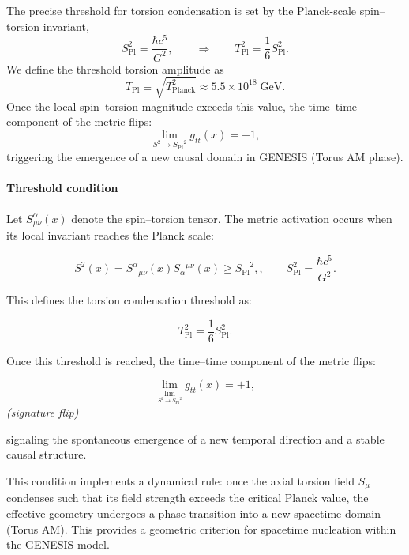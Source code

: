 \documentclass{article}
\newcommand{\Splanck}{\ensuremath{S_{\mathrm{Pl}}}}
\begin{document}
The precise threshold for torsion condensation is set by the Planck-scale spin–torsion invariant,
\begin{equation}\label{eq:auto39}
S_{\mathrm{Pl}}^2 = \frac{\hbar c^5}{G^2}, \qquad \Rightarrow \qquad T_{\mathrm{Pl}}^2 = \frac{1}{6} S_{\mathrm{Pl}}^2.
\end{equation}
We define the threshold torsion amplitude as
\begin{equation}\label{eq:auto40}
T_{\mathrm{Pl}} \equiv \sqrt{T_{\mathrm{Planck}}^2} \approx 5.5 \times 10^{18} \; \mathrm{GeV}.
\end{equation}
Once the local spin–torsion magnitude exceeds this value, the time–time component of the metric flips:
\begin{equation}\label{eq:auto41}
\lim_{S^2 \rightarrow \Splanck^2} g_{tt}(x) = +1,
\end{equation}
triggering the emergence of a new causal domain in GENESIS (Torus AM phase).


\paragraph{Threshold condition}

Let \( S_{\mu\nu}^\alpha(x) \) denote the spin–torsion tensor. The metric activation occurs when its local invariant reaches the Planck scale:

\begin{equation}\label{eq:auto42}
S^2(x) = S^\alpha{}_{\mu\nu}(x) S_\alpha{}^{\mu\nu}(x) \geq \Splanck^2,, \qquad S_{\mathrm{Pl}}^2 = \frac{\hbar c^5}{G^2}.
\end{equation}

This defines the torsion condensation threshold as:

\begin{equation}\label{eq:auto43}
T_{\mathrm{Pl}}^2 = \frac{1}{6} S_{\mathrm{Pl}}^2.
\end{equation}

Once this threshold is reached, the time–time component of the metric flips:

\begin{equation}\label{eq:auto44}
\lim_{\lim_{S^2 \rightarrow \Splanck^2}} g_{tt}(x) = +1,
\end{equation}
\textit{(signature flip)}

signaling the spontaneous emergence of a new temporal direction and a stable causal structure.

This condition implements a dynamical rule: once the axial torsion field \( S_\mu \) condenses such that its field strength exceeds the critical Planck value, the effective geometry undergoes a phase transition into a new spacetime domain (Torus AM). This provides a geometric criterion for spacetime nucleation within the GENESIS model.
\end{document}
